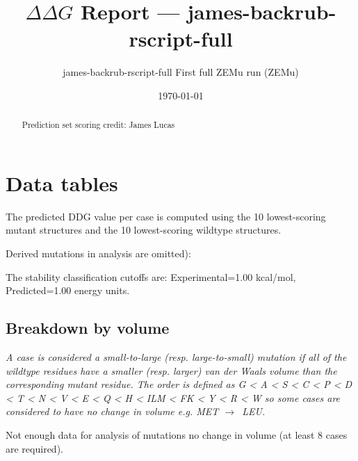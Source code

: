 \documentclass[10pt, letterpaper, oneside, titlepage, landscape]{scrreprt}
\title{$\Delta\Delta G$ Report --- james-backrub-rscript-full}
\subtitle{james-backrub-rscript-full First full ZEMu run (ZEMu)}
\date{\today}
\begin{document}
\maketitle
\tableofcontents

\clearpage

\begin{abstract}
Prediction set scoring credit: James Lucas

\end{abstract}


\clearpage

\section{Data tables}

The predicted DDG value per case is computed using the 10 lowest-scoring mutant structures and the 10 lowest-scoring wildtype structures.

Derived mutations in analysis are omitted):

The stability classification cutoffs are: Experimental=1.00 kcal/mol, Predicted=1.00 energy units.
\subsection{Breakdown by volume}
\textit{A case is considered a small-to-large (resp. large-to-small) mutation if all of the wildtype residues have a smaller (resp. larger) van der Waals volume than the corresponding mutant residue. The order is defined as G < A < S < C < P < D < T < N < V < E < Q < H < ILM < FK < Y < R < W so some cases are considered to have no change in volume e.g. MET $\rightarrow$\ LEU.}

Not enough data for analysis of mutations no change in volume (at least 8 cases are required).
\end{document}
